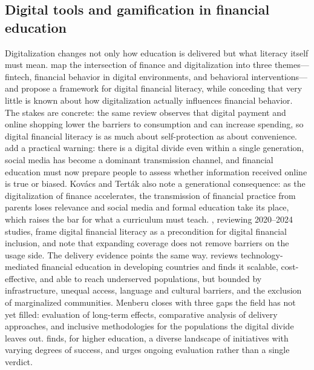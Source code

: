 \subsection{Digital tools and gamification in financial education}

Digitalization changes not only how education is delivered but what literacy
itself must mean. \textcite{koskelainen2023financial} map the intersection of
finance and digitalization into three themes---fintech, financial behavior in
digital environments, and behavioral interventions---and propose a framework
for digital financial literacy, while conceding that very little is known
about how digitalization actually influences financial behavior. The stakes are
concrete: the same review observes that digital payment and online shopping
lower the barriers to consumption and can increase spending, so digital
financial literacy is as much about self-protection as about convenience.
\textcite{kovacs2024thematic} add a practical warning: there is a digital
divide even within a single generation, social media has become a dominant
transmission channel, and financial education must now prepare people to
assess whether information received online is true or biased. Kovács and Terták also
note a generational consequence: as the digitalization of finance accelerates,
the transmission of financial practice from parents loses relevance and social
media and formal education take its place, which raises the bar for what a
curriculum must teach. \textcite{gumilar2024digital}, reviewing 2020--2024 studies, frame digital
financial literacy as a precondition for digital financial inclusion, and note
that expanding coverage does not remove barriers on the usage side. The
delivery evidence points the same way. \textcite{menberu2024technology}
reviews technology-mediated financial education in developing countries and
finds it scalable, cost-effective, and able to reach underserved populations,
but bounded by infrastructure, unequal access, language and cultural
barriers, and the exclusion of marginalized communities. Menberu closes with three gaps
the field has not yet filled: evaluation of long-term effects, comparative
analysis of delivery approaches, and inclusive methodologies for the
populations the digital divide leaves out. \textcite{lotter2024review} finds, for higher education, a diverse landscape
of initiatives with varying degrees of success, and urges ongoing evaluation
rather than a single verdict.

